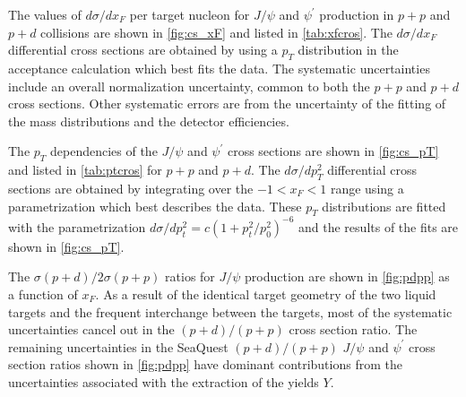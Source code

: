 \documentclass[reprint,aps,unsortedaddress,superscriptaddress,prl,floatfix,showpacs,linenumbers]{revtex4-2}
\begin{document}
The values of $d\sigma/ d x_F$ per target nucleon for $J/\psi$ and
$\psi^\prime$ production in $p+p$ and $p+d$ collisions are shown in
\cref{fig:cs_xF} and listed
in \cref{tab:xfcros}. The $d\sigma/ d x_F$ differential cross sections are
obtained by using a $p_T$ distribution in the acceptance calculation
which best fits the data. The systematic uncertainties
include an overall normalization
uncertainty, common to both the $p+p$ and $p+d$ cross sections.
Other systematic errors are from the uncertainty of the fitting
of the mass distributions and the detector efficiencies.

\begin{table}
	\caption{The differential cross sections per nucleon, $d\sigma/dx_F$
		(in \unit{\nano\barn}),
		for $J/\psi$ and $\psi^\prime$ production in $p+p$ and $p+d$
		collisions at \SI{120}{\GeV} for different $x_F$ bins.
		The statistical and the systematic uncertainties are also shown.}
	\begin{center}
		\label{tab:xfcros}
		
	\end{center}
\end{table}

The $p_T$ dependencies of the $J/\psi$ and $\psi^\prime$
cross sections are shown in \cref{fig:cs_pT} and listed in \cref{tab:ptcros}
for $p+p$ and $p+d$. The $d \sigma / d p_T^2$ differential
cross sections are obtained by integrating over the $-1<x_F<1$ range
using a parametrization which best describes the data.
These $p_T$ distributions are fitted with
the parametrization $d\sigma/dp_t^2 = c (1+p_t^2/p_0^2)^{-6}$\cite{kaplan1978}
and the results of the fits are shown in \cref{fig:cs_pT}.

\begin{table}
	\caption{The differential cross sections per nucleon, $d\sigma / dp^2_T$
		(in \unit{\nano\barn\per\GeV\squared}),
		for charmonium production in $p+p$ and $p+d$
		collisions at \SI{120}{\GeV} for different $p_T$ bins.
		The statistical and the systematic uncertainties are also shown.}
	\label{tab:ptcros}
	\begin{center}
		
	\end{center}
\end{table}

The $\sigma(p+d)/2\sigma(p+p)$ ratios for $J/\psi$ production are shown in
\cref{fig:pdpp} as a function of $x_F$.
As a result of the identical target geometry
of the two liquid targets and the frequent interchange between the targets,
most of the systematic uncertainties cancel out in the
$(p+d)/(p+p)$ cross section ratio. The remaining uncertainties in the
SeaQuest $(p+d)/(p+p)$ $J/\psi$
and $\psi^\prime$ cross section
ratios shown in \cref{fig:pdpp} have dominant contributions from the uncertainties
associated with the extraction of the yields $Y$.
\end{document}
